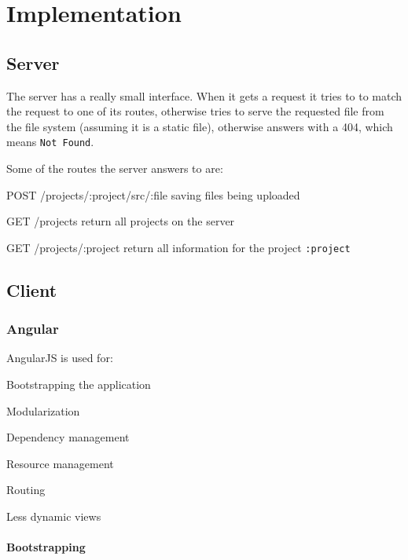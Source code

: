 
\section{Implementation}
\label{implementation}

\subsection{Server}

The server has a really small interface.
When it gets a request it tries to to match the request to one of its routes, otherwise tries to serve the requested file from the file system (assuming it is a static file), otherwise answers with a 404, which means \texttt{Not Found}.

Some of the routes the server answers to are:
\begin{description*}
  \item[POST /projects/:project/src/:file]
    saving files being uploaded
  \item[GET /projects]
    return all projects on the server
  \item[GET /projects/:project]
    return all information for the project \texttt{:project}
\end{description*}

\subsection{Client}

\subsubsection{Angular}
\label{angular}

AngularJS is used for:

\begin{itemize*}
  \item Bootstrapping the application
  \item Modularization
  \item Dependency management
  \item Resource management
  \item Routing
  \item Less dynamic views
\end{itemize*}

\paragraph{Bootstrapping}
\label{par:Bootstrapping and Routing}

